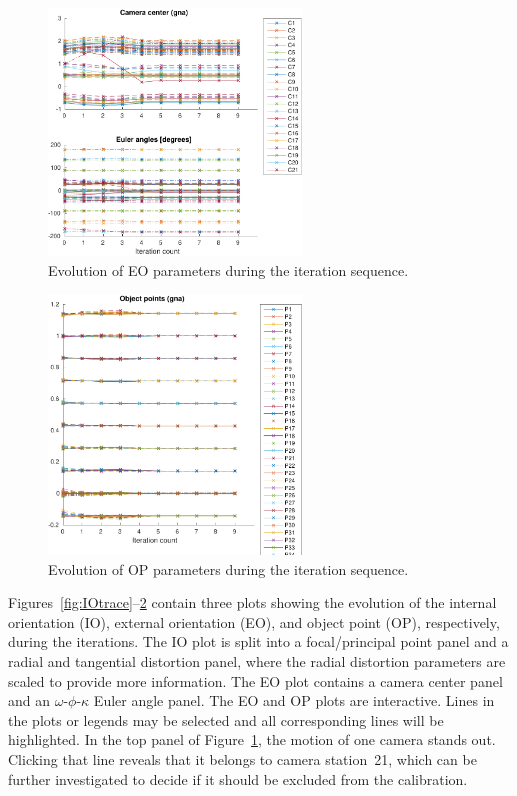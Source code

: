 \documentclass{article}
\begin{document}
\begin{figure}[tbp]
\centering
\includegraphics[width=0.6\textwidth]{./ill/ccameotrace.pdf}
\caption{\label{fig:EOtrace}
Evolution of EO parameters during the iteration sequence.}
\end{figure}

\begin{figure}[tbp]
\centering
\includegraphics[width=0.6\textwidth]{./ill/ccamoptrace.pdf}
\caption{\label{fig:OPtrace}
Evolution of OP parameters during the iteration sequence.}
\end{figure}

Figures~\ref{fig:IOtrace}--\ref{fig:OPtrace} contain three plots showing the
evolution of the internal orientation (IO), external orientation (EO),
and object point (OP), respectively, during the iterations. The IO
plot is split into a focal/principal point panel and a radial and
tangential distortion panel, where the radial distortion parameters
are scaled to provide more information. The EO plot contains a camera
center panel and an \(\omega\)-\(\phi\)-\(\kappa\) Euler angle panel. The EO and
OP plots are interactive. Lines in the plots or legends may be
selected and all corresponding lines will be highlighted. In the top
panel of Figure~\ref{fig:EOtrace}, the motion of one camera stands out.
Clicking that line reveals that it belongs to camera station~21,
which can be further investigated to decide if it should be excluded
from the calibration.
\end{document}
